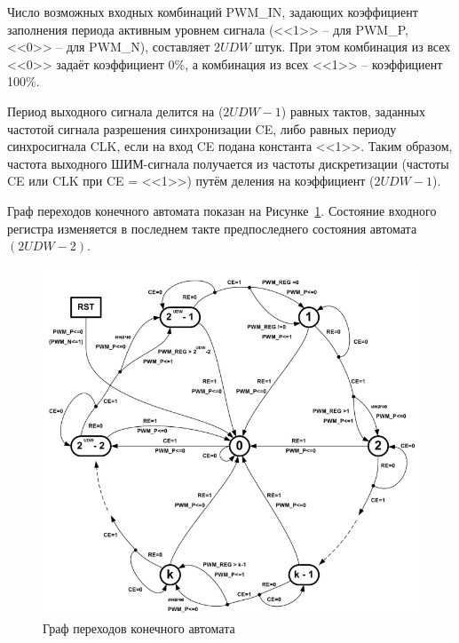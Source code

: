 Число возможных входных комбинаций PWM\_IN, задающих коэффициент
заполнения периода активным уровнем сигнала (<<1>> -- для PWM\_P, <<0>> -- для
PWM\_N), составляет $2UDW$ штук. При этом комбинация из всех <<0>> задаёт
коэффициент 0\%, а комбинация из всех <<1>> – коэффициент 100\%. 

Период выходного сигнала делится на ($2UDW-1$) равных тактов, заданных частотой
сигнала разрешения синхронизации CE, либо равных периоду синхросигнала
CLK, если на вход CE подана константа <<1>>. Таким образом, частота
выходного ШИМ-сигнала получается из частоты дискретизации (частоты CE
или CLK при CE = <<1>>) путём деления на коэффициент ($2UDW-1$).



Граф переходов конечного автомата показан на Рисунке~\ref{fig:5graph}.
Состояние входного регистра изменяется в последнем такте
предпоследнего состояния автомата $(2UDW - 2)$.

\begin{figure}[h!]
	\centering
	\includegraphics[width=0.55\linewidth]{course-plis/images/lab4/graph}
	\caption{Граф переходов конечного автомата}
	\label{fig:5graph}
\end{figure}

